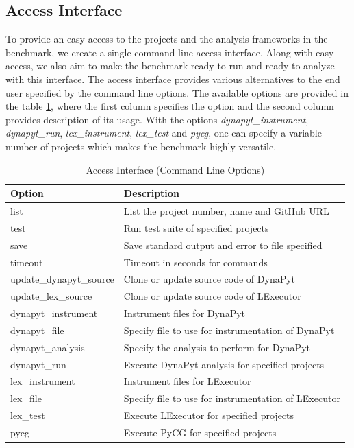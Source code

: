 \subsection{Access Interface}
\label{approach:access interface}
To provide an easy access to the projects and the analysis frameworks in the benchmark, we create a single command line access interface.
Along with easy access, we also aim to make the benchmark ready-to-run and ready-to-analyze with this interface. 
The access interface provides various alternatives to the end user specified by the command line options.
The available options are provided in the table \ref{table:access interface options}, where the first column specifies the option and the second column provides description of its usage.
With the options \textit{dynapyt\_instrument}, \textit{dynapyt\_run}, \textit{lex\_instrument}, \textit{lex\_test} and \textit{pycg}, one can specify a variable number of projects which makes the benchmark highly versatile.

\begin{table}[ht]
    \centering
    \begin{tabular}{ll}
    \hline
    \textbf{Option} & \textbf{Description}\\
    \hline
    list    & List the project number, name and GitHub URL\\
    test    & Run test suite of specified projects\\
    save    & Save standard output and error to file specified\\
    timeout & Timeout in seconds for commands\\
    update\_dynapyt\_source   & Clone or update source code of DynaPyt\\
    update\_lex\_source   & Clone or update source code of LExecutor\\
    dynapyt\_instrument  & Instrument files for DynaPyt\\
    dynapyt\_file    & Specify file to use for instrumentation of DynaPyt\\
    dynapyt\_analysis    & Specify the analysis to perform for DynaPyt\\
    dynapyt\_run & Execute DynaPyt analysis for specified projects\\
    lex\_instrument  & Instrument files for LExecutor\\
    lex\_file    & Specify file to use for instrumentation of LExecutor\\
    lex\_test    & Execute LExecutor for specified projects\\
    pycg    & Execute PyCG for specified projects\\
    \hline
    \end{tabular}
    \caption{Access Interface (Command Line Options)}
    \label{table:access interface options}
\end{table}


